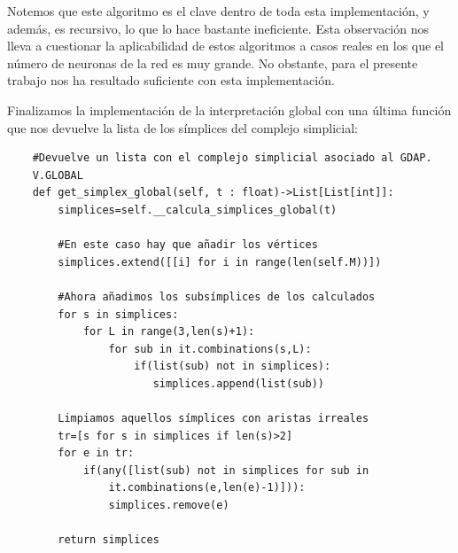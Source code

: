 \documentclass[12pt, a4paper, twoside]{book}
\numberwithin{equation}{section}
\theoremstyle{definition}
\theoremstyle{remark}
\theoremstyle{plain}
\begin{document}
	Notemos que este algoritmo es el clave dentro de toda esta 
	implementación, y además, es recursivo, lo que lo hace bastante 
	ineficiente. Esta observación nos lleva a 
	cuestionar la aplicabilidad de estos algoritmos a casos reales en los 
	que el número de neuronas de la red es muy grande. No obstante, para 
	el presente trabajo nos ha resultado suficiente con esta 
	implementación.

	Finalizamos la implementación de la interpretación global con una 
	última función que nos devuelve la lista de los símplices del complejo
	simplicial:
	\begin{verbatim}
	#Devuelve un lista con el complejo simplicial asociado al GDAP. 
	V.GLOBAL
	def get_simplex_global(self, t : float)->List[List[int]]:
        simplices=self.__calcula_simplices_global(t)
        
        #En este caso hay que añadir los vértices
        simplices.extend([[i] for i in range(len(self.M))])
        
        #Ahora añadimos los subsímplices de los calculados
        for s in simplices:
            for L in range(3,len(s)+1):
                for sub in it.combinations(s,L):
                    if(list(sub) not in simplices):
                       simplices.append(list(sub))
        
        Limpiamos aquellos símplices con aristas irreales
        tr=[s for s in simplices if len(s)>2]
        for e in tr:
            if(any([list(sub) not in simplices for sub in 
                it.combinations(e,len(e)-1)])):
                simplices.remove(e)

        return simplices
	\end{verbatim}
\end{document}

